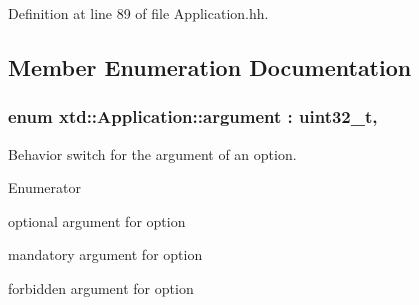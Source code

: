 Definition at line 89 of file Application.\+hh.



\subsection{Member Enumeration Documentation}
\subsubsection[{\texorpdfstring{argument}{argument}}]{\setlength{\rightskip}{0pt plus 5cm}enum {\bf xtd\+::\+Application\+::argument} \+: uint32\+\_\+t\hspace{0.3cm}{\ttfamily [strong]}, {\ttfamily [protected]}}\hypertarget{classxtd_1_1Application_a672c075ed901e463609077d571a714c7}{}\label{classxtd_1_1Application_a672c075ed901e463609077d571a714c7}


Behavior switch for the argument of an option. 

\begin{Desc}
\item[Enumerator]\par
\begin{description}
\item[{\em 
optional\hypertarget{classxtd_1_1Application_a672c075ed901e463609077d571a714c7ad57c24f3fe52d16e7169b912dd647f0d}{}\label{classxtd_1_1Application_a672c075ed901e463609077d571a714c7ad57c24f3fe52d16e7169b912dd647f0d}
}]optional argument for option \item[{\em 
mandatory\hypertarget{classxtd_1_1Application_a672c075ed901e463609077d571a714c7ac5e3b9675d114c21ad3367d318f6aa95}{}\label{classxtd_1_1Application_a672c075ed901e463609077d571a714c7ac5e3b9675d114c21ad3367d318f6aa95}
}]mandatory argument for option \item[{\em 
none\hypertarget{classxtd_1_1Application_a672c075ed901e463609077d571a714c7a334c4a4c42fdb79d7ebc3e73b517e6f8}{}\label{classxtd_1_1Application_a672c075ed901e463609077d571a714c7a334c4a4c42fdb79d7ebc3e73b517e6f8}
}]forbidden argument for option \end{description}
\end{Desc}


